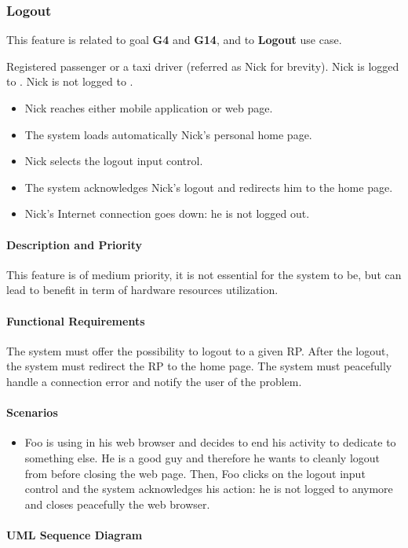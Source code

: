 \subsubsection{Logout}
This feature is related to goal \textbf{G4} and \textbf{G14}, and to \textbf{Logout} use case.
\begin{itemize}
	 Registered passenger or a taxi driver (referred as Nick for brevity).
	 Nick is logged to \myTaxiService{}.
	 Nick is not logged to \myTaxiService{}.
	\begin{itemize}
		\item Nick reaches either \myTaxiService{} mobile application or web page.
		\item The system loads automatically Nick's personal home page.
		\item Nick selects the logout input control.
		\item The system acknowledges Nick's logout and redirects him to the home page.
	\end{itemize}
	\begin{itemize}
		\item Nick's Internet connection goes down: he is not logged out.
	\end{itemize}
\end{itemize}
\paragraph{Description and Priority}
This feature is of medium priority, it is not essential for the system to be, but can lead to benefit in term of hardware resources utilization.\par
\paragraph{Functional Requirements}
\begin{itemize}
	 The system must offer the possibility to logout to a given RP.
	 After the logout, the system must redirect the RP to the \myTaxiService{} home page.
	 The system must peacefully handle a connection error and notify the user of the problem.
\end{itemize}
\paragraph{Scenarios}
\begin{itemize}
	\item Foo is using \myTaxiService{} in his web browser and decides to end his activity to dedicate to something else.
	He is a good guy and therefore he wants to cleanly logout from \myTaxiService{} before closing the web page.
	Then, Foo clicks on the logout input control and the system acknowledges his action: he is not logged to \myTaxiService{} anymore and closes peacefully the web browser.
\end{itemize}
\paragraph{UML Sequence Diagram}

